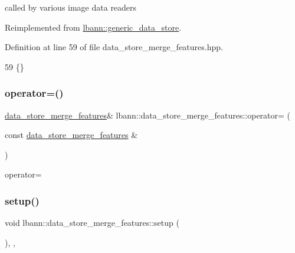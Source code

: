 called by various image data readers 



Reimplemented from \hyperlink{classlbann_1_1generic__data__store_a2abb3d0327b528d36e23fcef9b937798}{lbann\+::generic\+\_\+data\+\_\+store}.



Definition at line 59 of file data\+\_\+store\+\_\+merge\+\_\+features.\+hpp.


\begin{DoxyCode}
59 \{\}
\end{DoxyCode}
\mbox{\label{classlbann_1_1data__store__merge__features_a5c44079726232d7c015f650dcd7f52ca}} 
\subsubsection{\texorpdfstring{operator=()}{operator=()}}
{\footnotesize\ttfamily \hyperlink{classlbann_1_1data__store__merge__features}{data\+\_\+store\+\_\+merge\+\_\+features}\& lbann\+::data\+\_\+store\+\_\+merge\+\_\+features\+::operator= (\begin{DoxyParamCaption}\item[{const \hyperlink{classlbann_1_1data__store__merge__features}{data\+\_\+store\+\_\+merge\+\_\+features} \&}]{ }\end{DoxyParamCaption})\hspace{0.3cm}{\ttfamily [default]}}



operator= 

\mbox{\label{classlbann_1_1data__store__merge__features_aecb1fbbbc0c0ee9647cf178487eb2c02}} 
\subsubsection{\texorpdfstring{setup()}{setup()}}
{\footnotesize\ttfamily void lbann\+::data\+\_\+store\+\_\+merge\+\_\+features\+::setup (\begin{DoxyParamCaption}{ }\end{DoxyParamCaption})\hspace{0.3cm}{\ttfamily [inline]}, {\ttfamily [override]}, {\ttfamily [virtual]}}



